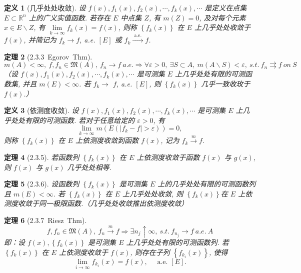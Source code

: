 \documentclass[10pt,openany]{book}
\theoremstyle{thmstyle} %
\newtheorem{theorem}{定理}[chapter]
\theoremstyle{defstyle} %
\newtheorem{definition}[theorem]{定义}
\theoremstyle{prostyle} %
\begin{document}
\begin{definition}[几乎处处收敛]
设 $f(x), f_1(x), f_2(x), \cdots, f_k(x), \cdots$ 是定义在点集 $E \subset \mathbb{R}^n$ 上的广义实值函数. 若存在 $E$ 中点集 $Z$, 有 $m(Z)=0$, 及对每个元素 $x \in E \backslash Z$, 有 $\lim\limits _{k \rightarrow \infty} f_k(x)=f(x)$, 则称 $\left\{f_k(x)\right\}$ 在 $E$ 上几乎处处收敛于 $f(x)$, 并简记为 $f_k \rightarrow f$, a.e. $[E]$ 或 $f_k \xrightarrow{\text { a.e. }} f$.
\end{definition}

\begin{theorem}[2.3.3~Egorov~Thm]
\begin{equation}
m(A)<\infty,~f,f_n \in \mathfrak{M}(A),~f_n \rightarrow f ~ a.e. \Rightarrow \forall \varepsilon>0,~\exists S\subset A,~m(A\backslash S)<\varepsilon,~ s.t. ~ f_n \rightrightarrows f ~ on ~ S
\end{equation}
（设 $f(x), f_1(x), f_2(x), \cdots, f_k(x), \cdots$ 是可测集 $E$ 上几乎处处有限的可测函数集, 并且 $m(E)<\infty$. 若 $f_k \rightarrow$ $f$, a.e. $[E]$, 则 $\left\{f_k(x)\right\}$ 几乎一致收玫于 $f(x)$.）
\end{theorem}

\begin{definition}[依测度收敛]
设 $f(x), f_1(x), f_2(x), \cdots, f_k(x), \cdots$ 是可测集 $E$ 上几乎处处有限的可测函数. 若对于任意给定的 $\varepsilon>0$, 有
\begin{equation}
\lim _{k \rightarrow \infty} m\left(E\left(\left|f_k-f\right|>\varepsilon\right)\right)=0,
\end{equation}
则称 $\left\{f_k(x)\right\}$ 在 $E$ 上依测度收敛到函数 $f(x)$, 记为 $f_k \xrightarrow{m} f$.
\end{definition}

\begin{theorem}[2.3.5]
若函数列 $\left\{f_k(x)\right\}$ 在 $E$ 上依测度收敛于函数 $f(x)$ 与 $g(x)$, 则 $f(x)$ 与 $g(x)$ 几乎处处相等.
\end{theorem}

\begin{theorem}[2.3.6]
设函数列 $\left\{f_k(x)\right\}$ 是可测集 $E$ 上的几乎处处有限的可测函数列且 $m(E)<\infty$. 若 $\left\{f_k(x)\right\}$ 在 $E$ 上几乎处处收敛, 则 $\left\{f_k(x)\right\}$在 $E$ 上依测度收敛于同一极限函数.（几乎处处收敛推出依测度收敛）
\end{theorem}

\begin{theorem}[2.3.7~Riesz~Thm]
\begin{equation}
f,f_n \in \mathfrak{M}(A),~ f_n \xrightarrow{m} f  \Rightarrow \exists n_j \uparrow \infty, ~ s.t. ~ f_{n_j} \rightarrow f ~ a.e. ~ A
\end{equation}
即：设 $f(x),\left\{f_k(x)\right\}$ 是可测集 $E$ 上几乎处处有限的可测函数列. 若 $\left\{f_k(x)\right\}$ 在 $E$ 上依测度收敛于 $f(x)$, 则存在子列 $\left\{f_{k_i}(x)\right\}$, 使得
\begin{equation}
\lim _{i \rightarrow \infty} f_{k_i}(x)=f(x), \quad \text { a.e. }[E] .
\end{equation}
\end{theorem}
\end{document}
